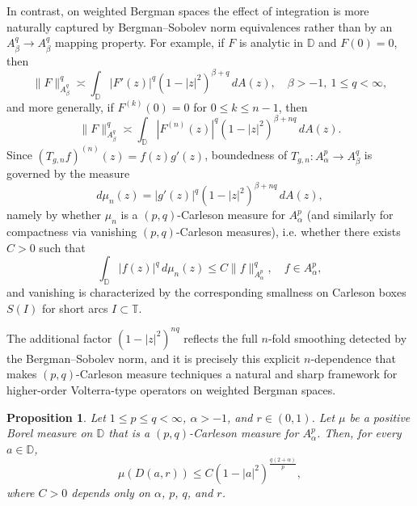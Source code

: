 \documentclass[preprint,12pt]{elsarticle}
\numberwithin{equation}{section}
\newtheorem{proposition}{Proposition}[section]
\theoremstyle{remark}
\begin{document}
In contrast, on weighted Bergman spaces the effect of integration is more naturally captured by Bergman--Sobolev norm equivalences rather than by an
$A_\beta^q\to A_\beta^q$ mapping property. For example, if $F$ is analytic in $\mathbb D$
and $F(0)=0$, then
\begin{equation*}
\|F\|_{A_\beta^q}^q
\asymp
\int_{\mathbb D}|F'(z)|^q (1-|z|^2)^{\beta+q}\,dA(z),
\quad \beta>-1,\ 1\le q<\infty,
\end{equation*}
and more generally, if $F^{(k)}(0)=0$ for $0\le k\le n-1$, then
\begin{equation*}
\|F\|_{A_\beta^q}^q
\asymp
\int_{\mathbb D}|F^{(n)}(z)|^q (1-|z|^2)^{\beta+nq}\,dA(z).
\end{equation*}
Since $(T_{g,n}f)^{(n)}(z)=f(z)g'(z)$, boundedness of
$T_{g,n}:A_\alpha^p\to A_\beta^q$ is governed by the measure
\begin{equation*}
d\mu_n(z)=|g'(z)|^q(1-|z|^2)^{\beta+nq}\,dA(z),
\end{equation*}
namely by whether $\mu_n$ is a $(p,q)$-Carleson measure for $A_\alpha^p$ (and similarly
for compactness via vanishing $(p,q)$-Carleson measures), i.e. whether there exists $C>0$
such that
\begin{equation*}
\int_{\mathbb D}|f(z)|^q\,d\mu_n(z)\le C\|f\|_{A_\alpha^p}^q,\quad f\in A_\alpha^p,
\end{equation*}
and vanishing is characterized by the corresponding smallness on Carleson boxes $S(I)$
for short arcs $I\subset\mathbb T$.

The additional factor $(1-|z|^2)^{nq}$ reflects the full $n$-fold smoothing detected by
the Bergman--Sobolev norm, and it is precisely this explicit $n$-dependence that makes
$(p,q)$-Carleson measure techniques a natural and sharp framework for higher-order
Volterra-type operators on weighted Bergman spaces.


\begin{proposition}\label{prop:carleson-condition}
Let $1 \leq p \leq q < \infty$, $\alpha > -1$, and $r \in (0,1)$.
Let $\mu$ be a positive Borel measure on $\mathbb{D}$ that is a $(p,q)$-Carleson measure for $A_\alpha^p$.
Then, for every $a \in \mathbb{D}$,
\begin{equation*}
\mu(D(a,r)) \leq C (1 - |a|^2)^{\frac{q(2+\alpha)}{p}},
\end{equation*}
where $C>0$ depends only on $\alpha$, $p$, $q$, and $r$.
\end{proposition}
\end{document}
